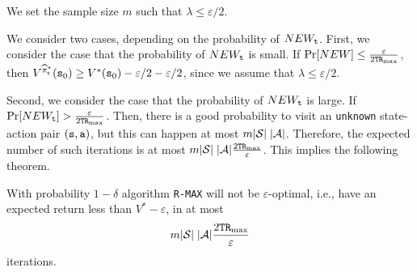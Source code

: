 
We set the sample size $m$ such that $\lambda \leq\varepsilon/2$.

We consider two cases, depending on the probability of $NEW_{\tt t}$. First,
we consider the case that the probability of $NEW_{\tt t}$ is small. If
$\Pr[NEW]\leq \frac{\varepsilon}{2{\tt T}{\tt R}_{\max }}$, then
$V^{\widehat{\pi}^*_{\tt t}}({\tt s}_0)\geq V^*({\tt s}_0)
-\varepsilon/2 -\varepsilon/2$, since we assume that $\lambda\leq
\varepsilon/2$.

Second, we consider the case that the probability of $NEW_{\tt t}$ is large.
If $\Pr[NEW_{\tt t}] > \frac{\varepsilon}{2{\tt T}{\tt R}_{\max }}$. Then, there is a good
probability to visit an \texttt{unknown} state-action pair $({\tt s},{\tt a})$, but this
can happen at most $m|\mathcal{S}|\;|\mathcal{A}|$. Therefore, the expected
number of such iterations is at most
$m|\mathcal{S}|\;|\mathcal{A}|\frac{2{\tt T}{\tt R}_{\max }}{\varepsilon}$.
This implies the following theorem.


\begin{theorem}
With probability $1-\delta$ algorithm \texttt{R-MAX} will not be $\varepsilon$-optimal, i.e., have an expected return less than $V^*-\varepsilon$, in at most 
\[
m|\mathcal{S}|\;|\mathcal{A}|\frac{2{\tt T}{\tt R}_{\max }}{\varepsilon}
\]
iterations.
\end{theorem}

